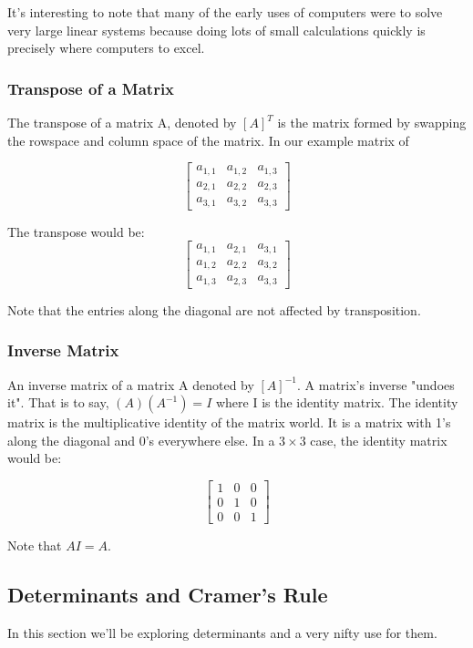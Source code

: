 It's interesting to note that many of the early uses of computers were to solve very large linear systems because doing lots of small calculations quickly is precisely where computers to excel.

\subsubsection{Transpose of a Matrix}

The transpose of a matrix A, denoted by $[A]^{T}$ is the matrix formed by swapping the rowspace and column space of the matrix. In our example matrix of
 
$$
\begin{bmatrix}
a_{1,1}&a_{1,2}&a_{1,3}\\
a_{2,1}&a_{2,2}&a_{2,3}\\ 
a_{3,1}&a_{3,2}&a_{3,3}
\end{bmatrix}
$$

The transpose would be:
$$
\begin{bmatrix}
a_{1,1}&a_{2,1}&a_{3,1}\\
a_{1,2}&a_{2,2}&a_{3,2}\\ 
a_{1,3}&a_{2,3}&a_{3,3}
\end{bmatrix}
$$

Note that the entries along the diagonal are not affected by transposition.

\subsubsection{Inverse Matrix}

An inverse matrix of a matrix A denoted by $[A]^{-1}$. A matrix's inverse "undoes it".
That is to say, $(A)(A^{-1}) = I$ where I is the identity matrix. The identity matrix is the multiplicative identity of the matrix world. It is a matrix with 1's along the diagonal and 0's everywhere else. In a $3 \times 3$ case, the identity matrix would be:

$$
\begin{bmatrix}
1&0&0\\
0&1&0\\ 
0&0&1
\end{bmatrix}
$$

Note that $AI = A$.

\subsection{Determinants and Cramer’s Rule}
In this section we'll be exploring determinants and a very nifty use for them.
 
